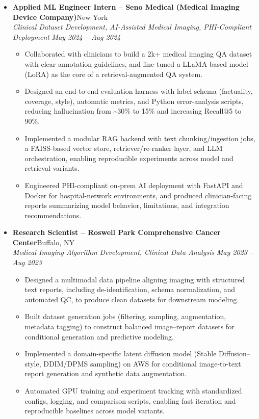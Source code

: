 \documentclass[letterpaper,10pt]{article}
\begin{document}
\begin{itemize}[leftmargin=0in, label={}]

  \item
  \textbf{Applied ML Engineer Intern -- Seno Medical (Medical Imaging Device Company)}\hfill New York \\
  \textit{Clinical Dataset Development, AI-Assisted Medical Imaging, PHI-Compliant Deployment} \hfill \textit{May 2024 -- Aug 2024}
  \begin{itemize}[leftmargin=0.2in, topsep=1pt]
    \item Collaborated with clinicians to build a 2k+ medical imaging QA dataset with clear annotation guidelines, and fine-tuned a LLaMA-based model (LoRA) as the core of a retrieval-augmented QA system.
    \item Designed an end-to-end evaluation harness with label schema (factuality, coverage, style), automatic metrics, and Python error-analysis scripts, reducing hallucination from \textasciitilde30\% to 15\% and increasing Recall@5 to 90\%.
    \item Implemented a modular RAG backend with text chunking/ingestion jobs, a FAISS-based vector store, retriever/re-ranker layer, and LLM orchestration, enabling reproducible experiments across model and retrieval variants.
    \item Engineered PHI-compliant on-prem AI deployment with FastAPI and Docker for hospital-network environments, and produced clinician-facing reports summarizing model behavior, limitations, and integration recommendations.
  \end{itemize}

  \vspace{3pt}

  \item
  \textbf{Research Scientist -- Roswell Park Comprehensive Cancer Center}\hfill Buffalo, NY \\
  \textit{Medical Imaging Algorithm Development, Clinical Data Analysis} \hfill \textit{May 2023 -- Aug 2023}
  \begin{itemize}[leftmargin=0.2in, topsep=1pt]
    \item Designed a multimodal data pipeline aligning imaging with structured text reports, including de-identification, schema normalization, and automated QC, to produce clean datasets for downstream modeling.
    \item Built dataset generation jobs (filtering, sampling, augmentation, metadata tagging) to construct balanced image--report datasets for conditional generation and predictive modeling.
    \item Implemented a domain-specific latent diffusion model (Stable Diffusion--style, DDIM/DPMS sampling) on AWS for conditional image-to-text report generation and synthetic data augmentation.
    \item Automated GPU training and experiment tracking with standardized configs, logging, and comparison scripts, enabling fast iteration and reproducible baselines across model variants.
  \end{itemize}


\end{itemize}
\end{document}
